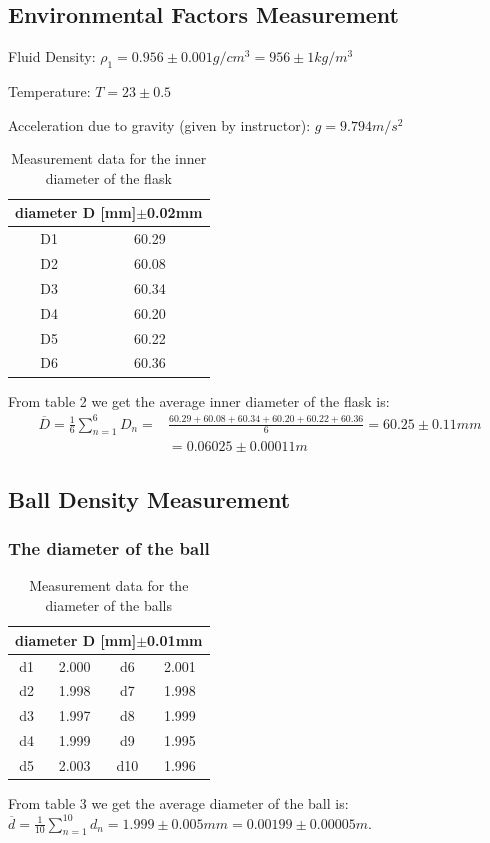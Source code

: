 \documentclass[12pt,a4paper]{article}
\begin{document}
\subsection{Environmental Factors Measurement}
Fluid Density: $\rho_1=0.956\pm 0.001g/cm^3=956\pm 1kg/m^3$\par 
Temperature: $T=23\pm 0.5$\textcelsius \par 
Acceleration due to gravity (given by instructor): $g=9.794m/s^2$
\begin{table}[H]
    \centering
    \begin{tabular}{|c|c|}
        \hline
        \multicolumn{2}{|c|}{diameter D [mm]$\pm$0.02mm} \\
        \hline
        D1 & 60.29 \\
        \hline  
        D2 & 60.08 \\
        \hline 
        D3 & 60.34 \\
        \hline
        D4 & 60.20 \\
        \hline 
        D5 & 60.22 \\
        \hline
        D6 & 60.36 \\
        \hline
    \end{tabular}
    \caption{ Measurement data for the inner diameter of the flask}
\end{table}
From table 2 we get the average inner diameter of the flask is:
$$\begin{aligned}
    \overline{D}=\frac{1}{6}\sum^6_{n=1}D_n=&\frac{60.29+60.08+60.34+60.20+60.22+60.36}{6}=60.25\pm0.11mm\\
    &=0.06025\pm0.00011m
\end{aligned}$$

\subsection{Ball Density Measurement}
\subsubsection{The diameter of the ball}
\begin{table}[H]
    \centering
    \begin{tabular}{|c|c||c|c|}
        \hline
        \multicolumn{4}{|c|}{diameter D [mm]$\pm$0.01mm} \\
        \hline
        d1 & 2.000 & d6 & 2.001 \\
        \hline 
        d2 & 1.998 & d7 & 1.998 \\
        \hline
        d3 & 1.997 & d8 & 1.999 \\
        \hline 
        d4 & 1.999 & d9 & 1.995 \\
        \hline
        d5 & 2.003 & d10 & 1.996 \\
        \hline
    \end{tabular}
    \caption{Measurement data for the diameter of the balls}
\end{table}
From table 3 we get the average diameter of the ball is: $\overline{d}=\frac{1}{10}\sum_{n=1}^{10}d_n=1.999\pm 0.005mm=0.00199\pm 0.00005m$.
\end{document}
